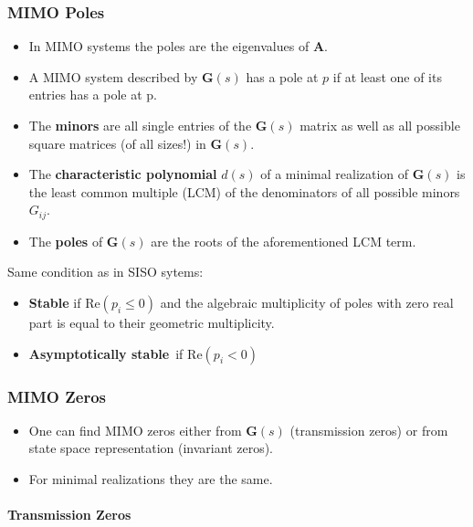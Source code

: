 \subsubsection{MIMO Poles}
\begin{itemize}
    \item In MIMO systems the poles are the eigenvalues of $\mathbf{A}$.
    \item A MIMO system described by $\mathbf{G}(s)$ has a pole at $p$ if at least one of its entries has a pole at p.
    \item The \textbf{minors} are all single entries of the $\mathbf{G}(s)$ matrix as well as all possible square matrices (of all sizes!) in $\mathbf{G}(s)$.
    \item The \textbf{characteristic polynomial} $d(s)$ of a minimal realization of $\mathbf{G}(s)$ is the least common multiple (LCM) of the denominators of all possible minors $G_{ij}$.
    \item The \textbf{poles} of $\mathbf{G}(s)$ are the roots of the aforementioned LCM term.
\end{itemize}



Same condition as in SISO sytems:
\begin{itemize}
    \item \textbf{Stable} if $\mathrm{Re}(p_i \le 0)$ and the algebraic multiplicity of poles with zero real part is equal to their geometric multiplicity.
    \item \textbf{Asymptotically stable}\ if $\mathrm{Re}(p_i<0)$
\end{itemize}


\subsubsection{MIMO Zeros}
\begin{itemize}
    \item One can find MIMO zeros either from $\mathbf{G}(s)$ (transmission zeros) or from state space representation (invariant zeros).
    \item For minimal realizations they are the same.
\end{itemize}

\paragraph{Transmission Zeros}

